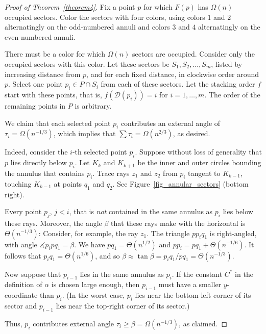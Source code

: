 \documentclass[11pt]{article}
\begin{document}
\begin{proof}[Proof of Theorem~\ref{theorem4}] Fix a point $p$ for which
$F(p)$ has $\Omega(n)$ occupied sectors. Color the sectors with
four colors, using colors $1$ and $2$ alternatingly on the
odd-numbered annuli and colors $3$ and $4$ alternatingly on the
even-numbered annuli.

There must be a color for which $\Omega(n)$ sectors are
occupied. Consider only the occupied sectors with this color.
Let these sectors be $S_1, S_2, \ldots, S_m$, listed by
increasing distance from $p$, and for each fixed distance, in
clockwise order around $p$. Select one point $p_i\in P\cap S_i$
from each of these sectors. Let the stacking order $f$ start with these
points, that is, $f(\mathcal D(p_i))=i$ for $i=1,\ldots,m$. The order of the
remaining points in $P$ is arbitrary.

We claim that each selected point $p_i$ contributes an external
angle of $\tau_i = \Omega(n^{-1/3})$, which implies that $\sum
\tau_i = \Omega(n^{2/3})$, as desired.

Indeed, consider the $i$-th selected point $p_i$. Suppose
without loss of generality that $p$ lies directly below $p_i$.
Let $K_k$ and $K_{k+1}$ be the inner and outer circles bounding
the annulus that contains $p_i$. Trace rays $z_1$ and $z_2$
from $p_i$ tangent to $K_{k-1}$, touching $K_{k-1}$ at points
$q_1$ and $q_2$. See Figure~\ref{fig_annular_sectors} (bottom right).

Every point $p_j$, $j<i$, that is \emph{not} contained in the
same annulus as $p_i$ lies below these rays. Moreover, the
angle $\beta$ that these rays make with the horizontal is
$\Theta(n^{-1/3})$: Consider, for example, the ray $z_1$. The
triangle $pp_iq_1$ is right-angled, with angle $\measuredangle
p_ipq_1 = \beta$. We have $pq_1 = \Theta(n^{1/2})$ and $pp_i =
pq_1 + \Theta(n^{-1/6})$. It follows that $p_iq_1 =
\Theta(n^{1/6})$, and so $\beta \approx \tan \beta = p_iq_1 /
pq_1 = \Theta(n^{-1/3})$.

Now suppose that $p_{i-1}$ lies in the same annulus as $p_i$.
If the constant $C^*$ in the definition of $\alpha$ is chosen
large enough, then $p_{i-1}$ must have a smaller $y$-coordinate
than $p_i$. (In the worst case, $p_i$ lies near the bottom-left
corner of its sector and $p_{i-1}$ lies near the top-right
corner of its sector.)

Thus, $p_i$ contributes external angle $\tau_i\ge \beta =
\Omega(n^{-1/3})$, as claimed.
\end{proof}
\end{document}
